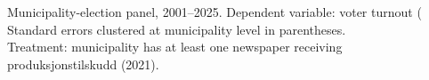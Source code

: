 \begin{table}[htbp]
   \par \raggedright 
   Municipality-election panel, 2001--2025. Dependent variable: voter turnout (\\%
   Standard errors clustered at municipality level in parentheses.\\
   Treatment: municipality has at least one newspaper receiving produksjonstilskudd (2021).
\end{table}


